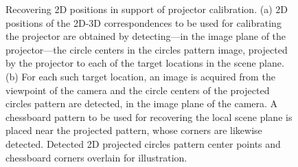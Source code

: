 \documentclass[review]{elsarticle}
\begin{document}
\begin{figure}
    \centering
    \qquad
    \caption{Recovering 2D positions in support of projector calibration. (a) 2D positions of the 2D-3D correspondences to be used for calibrating the projector are obtained by detecting---in the image plane of the projector---the circle centers in the circles pattern image, projected by the projector to each of the target locations in the scene plane. (b) For each such target location, an image is acquired from the viewpoint of the camera and the circle centers of the projected circles pattern are detected, in the image plane of the camera. A chessboard pattern to be used for recovering the local scene plane is placed near the projected pattern, whose corners are likewise detected. Detected 2D projected circles pattern center points and chessboard corners overlain for illustration.} %
    \label{fig:2d}
\end{figure}
\end{document}

